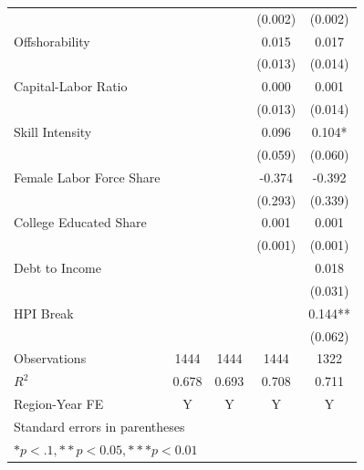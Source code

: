 \documentclass[12pt, final]{CSP}
\begin{document}
\begin{table}[htbp]
\begin{tabular}{l*{4}{c}}
                    &            &            &  (0.002)   &  (0.002)   \\
\addlinespace
Offshorability      &            &            &    0.015   &    0.017   \\
                    &            &            &  (0.013)   &  (0.014)   \\
\addlinespace
Capital-Labor Ratio &            &            &    0.000   &    0.001   \\
                    &            &            &  (0.013)   &  (0.014)   \\
\addlinespace
Skill Intensity     &            &            &    0.096   &    0.104*  \\
                    &            &            &  (0.059)   &  (0.060)   \\
\addlinespace
Female Labor Force Share&            &            &   -0.374   &   -0.392   \\
                    &            &            &  (0.293)   &  (0.339)   \\
\addlinespace
College Educated Share&            &            &    0.001   &    0.001   \\
                    &            &            &  (0.001)   &  (0.001)   \\
\addlinespace
Debt to Income      &            &            &            &    0.018   \\
                    &            &            &            &  (0.031)   \\
\addlinespace
HPI Break           &            &            &            &    0.144** \\
                    &            &            &            &  (0.062)   \\
\midrule
Observations        &     1444   &     1444   &     1444   &     1322   \\
\(R^{2}\)           &    0.678   &    0.693   &    0.708   &    0.711   \\
Region-Year FE      &        Y   &        Y   &        Y   &        Y   \\
\hline
\bottomrule
\multicolumn{5}{l}{\footnotesize Standard errors in parentheses}\\
\multicolumn{5}{l}{\footnotesize $* p<.1, ** p<0.05, *** p<0.01$}\\
\end{tabular}
\end{table}

\newline
\newline
\end{document}
